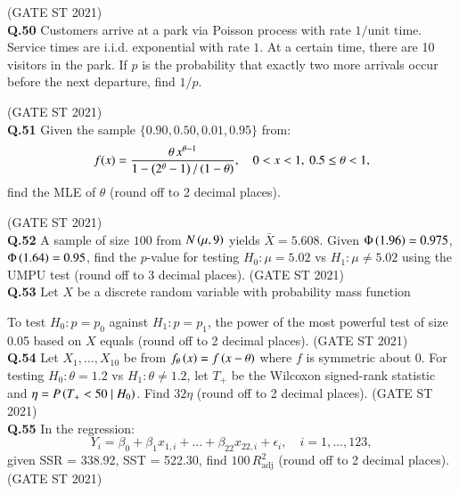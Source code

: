 \documentclass[journal,12pt,onecolumn]{IEEEtran}
\theoremstyle{remark}
\begin{document}
\hfill (GATE ST 2021) \\

\textbf{Q.50}
Customers arrive at a park via Poisson process with rate $1/\text{unit time}$.  
Service times are i.i.d. exponential with rate $1$. At a certain time, there are 10 visitors in the park.  
If $p$ is the probability that exactly two more arrivals occur before the next departure, find $1/p$.

\hfill (GATE ST 2021) \\

\textbf{Q.51}
Given the sample $\{0.90, 0.50, 0.01, 0.95 \}$ from:
\[
f(x) = \frac{\theta\, x^{\theta - 1}}{1 - \left(2^{\theta} - 1\right)/\left(1- \theta\right)}, \quad 0 < x < 1, \ 0.5 \le \theta < 1,
\]
find the MLE of $\theta$ (round off to 2 decimal places).

\hfill (GATE ST 2021) \\
\textbf{Q.52}
A sample of size $100$ from $N\left(\mu,9\right)$ yields $\bar{X} = 5.608$.  
Given $\Phi\left(1.96\right)= 0.975$, $\Phi\left(1.64\right) = 0.95$,  
find the $p$-value for testing $H_0: \mu = 5.02$ vs $H_1: \mu \neq 5.02$ using the UMPU test  
(round off to 3 decimal places).
\hfill (GATE ST 2021) \\
\textbf{Q.53}
Let $X$ be a discrete random variable with probability mass function

  \bigskip

To test $H_0: p = p_0$ against $H_1: p = p_1$, the power of the most powerful test of size 0.05 based on $X$ equals (round off to 2 decimal places).
\hfill (GATE ST 2021) \\
\textbf{Q.54}
Let $X_1,\dots,X_{10}$ be from $f_\theta\left(x\right) = f\left(x-\theta\right)$ where $f$ is symmetric about $0$.  
For testing $H_0: \theta = 1.2$ vs $H_1: \theta \neq 1.2$,  
let $T_+$ be the Wilcoxon signed-rank statistic and $\eta = P\left(T_+ < 50 \mid H_0\right)$.  
Find $32 \eta$ (round off to 2 decimal places).
\hfill (GATE ST 2021) \\
\textbf{Q.55}
In the regression:
\[
Y_i = \beta_0 + \beta_1 x_{1,i} + \dots + \beta_{22} x_{22,i} + \epsilon_i, \quad i=1,\dots,123,
\]
given SSR = 338.92, SST = 522.30,  
find $100\, R_{\text{adj}}^2$ (round off to 2 decimal places).
\hfill (GATE ST 2021) \\
\end{document}
